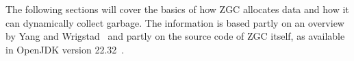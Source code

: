 
The following sections will cover the basics of how ZGC allocates data and how it can dynamically collect garbage. The information is based partly on an overview by Yang and Wrigstad~\cite{zgc:deep_dive} and partly on the source code of ZGC itself, as available in OpenJDK version 22.32~\cite{jdk:tag2232}.

